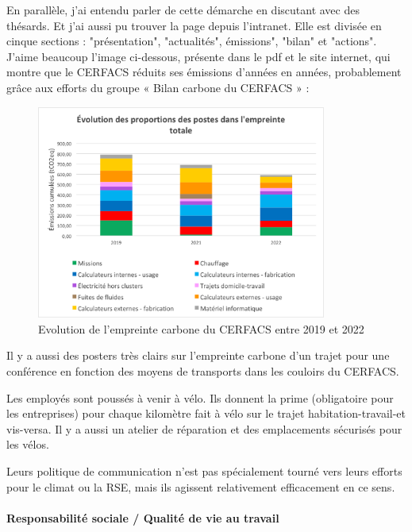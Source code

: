     En parallèle, j'ai entendu parler de cette démarche en discutant avec des thésards. Et j'ai aussi pu trouver la page depuis l'intranet. Elle est divisée en cinque sections : "présentation", "actualités", émissions", "bilan" et "actions".
    J'aime beaucoup l'image ci-dessous, présente dans le pdf et le site internet, qui montre que le CERFACS réduits ses émissions d'années en années, probablement grâce aux efforts du groupe « Bilan carbone du CERFACS »  : 

    \begin{figure}[H]
        \centering
        \includegraphics[width=0.85\textwidth]{images/evolution_postes_empreintecarbone.png}
        \caption{Evolution de l'empreinte carbone du CERFACS entre 2019 et 2022}
    \end{figure}

    Il y a aussi des posters très clairs sur l'empreinte carbone d'un trajet pour une conférence en fonction des moyens de transports dans les couloirs du CERFACS.

    Les employés sont poussés à venir à vélo. Ils donnent la prime (obligatoire pour les entreprises) pour chaque kilomètre fait à vélo sur le trajet habitation-travail-et vis-versa. Il y a aussi un atelier de réparation et des emplacements sécurisés pour les vélos.

    Leurs politique de communication n'est pas spécialement tourné vers leurs efforts pour le climat ou la RSE, mais ils agissent relativement efficacement en ce sens.

\paragraph{Responsabilité sociale / Qualité de vie au travail}
\hspace{0,5cm}

